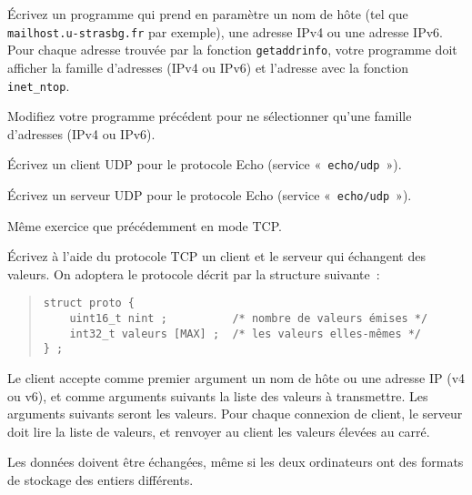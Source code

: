 %


% 

\question

Écrivez un programme qui prend en paramètre un nom de hôte (tel que
\texttt {mailhost.u-strasbg.fr} par exemple), une adresse IPv4 ou
une adresse IPv6. Pour chaque adresse trouvée par la fonction \texttt
{getaddrinfo}, votre programme doit afficher la famille d'adresses
(IPv4 ou IPv6) et l'adresse avec la fonction \texttt {inet\_ntop}.


\question

Modifiez votre programme précédent pour ne sélectionner qu'une
famille d'adresses (IPv4 ou IPv6).



\question

Écrivez un client UDP pour le protocole Echo (service «~\texttt
{echo/udp}~»).

Écrivez un serveur UDP pour le protocole Echo (service «~\texttt
{echo/udp}~»).

\question

Même exercice que précédemment en mode TCP.


\question

Écrivez à l'aide du protocole TCP un client et le serveur qui
échangent des valeurs. On adoptera le protocole décrit par la
structure suivante~:

\begin {quote}
\begin {verbatim}
struct proto {
    uint16_t nint ;          /* nombre de valeurs émises */
    int32_t valeurs [MAX] ;  /* les valeurs elles-mêmes */
} ;
\end{verbatim}
\end {quote}

Le client accepte comme premier argument un nom de hôte ou une
adresse IP (v4 ou v6), et comme arguments suivants la liste des
valeurs à transmettre. Les arguments suivants seront les valeurs.
Pour chaque connexion de client, le serveur doit lire la liste de
valeurs, et renvoyer au client les valeurs élevées au carré.

Les données doivent être échangées, même si les deux ordinateurs
ont des formats de stockage des entiers différents.


